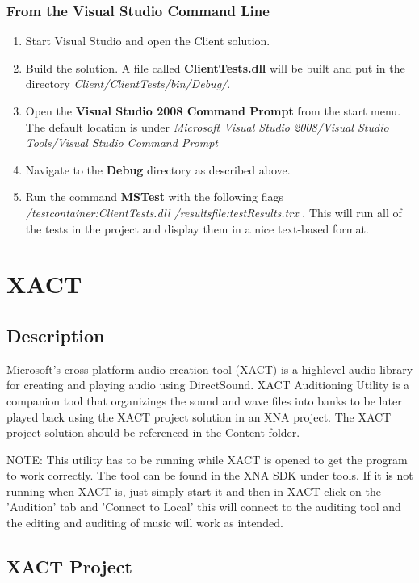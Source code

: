 \subsubsection{From the Visual Studio Command Line}
\begin{enumerate}
\item Start Visual Studio and open the Client solution.
\item Build the solution. A file called \textbf{ClientTests.dll} will be built and put in the directory \textit{Client/ClientTests/bin/Debug/}.
\item Open the \textbf{Visual Studio 2008 Command Prompt} from the start menu. The default location is under \textit{Microsoft Visual Studio 2008/Visual Studio Tools/Visual Studio Command Prompt}
\item Navigate to the \textbf{Debug} directory as described above. 
\item Run the command \textbf{MSTest} with the following flags \textit{/testcontainer:ClientTests.dll /resultsfile:testResults.trx} . This will run all of the tests in the project and display them in a nice text-based format. 
\end{enumerate} 

\section{XACT}

\subsection{Description}

Microsoft's cross-platform audio creation tool (XACT) is a highlevel audio library for creating and playing audio using DirectSound. XACT Auditioning Utility is a companion tool that organizings the sound and wave files into banks to be later played back using the XACT project solution in an XNA project. The XACT project solution should be referenced in the Content folder.

NOTE:
This utility has to be running while XACT is opened to get the program to work correctly. The tool can be found in the XNA SDK under tools. If it is not running when XACT is, just simply start it and then in XACT click on the 'Audition' tab and 'Connect to Local' this will connect to the auditing tool and the editing and auditing of music will work as intended.

\subsection{XACT Project}

